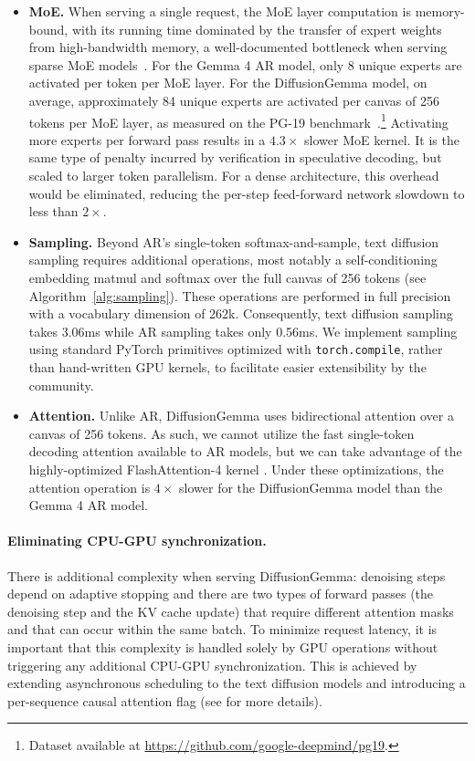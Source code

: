 \documentclass[11pt, a4paper, logo, copyright, gdm]{google}
\begin{document}
\begin{itemize}[topsep=0pt]
    \item \textbf{MoE.} When serving a single request, the MoE layer computation is memory-bound, with its running time dominated by the transfer of expert weights from high-bandwidth memory, a well-documented bottleneck when serving sparse MoE models~\citep{rajbhandari2022deepspeedmoe, huang2024efficient}. For the Gemma 4 AR model, only 8 unique experts are activated per token per MoE layer. For the DiffusionGemma model, on average, approximately 84 unique experts are activated per canvas of 256 tokens per MoE layer, as measured on the PG-19 benchmark~\citep{rae2020compressive}.\footnote{Dataset available at \url{https://github.com/google-deepmind/pg19}.} Activating more experts per forward pass results in a $4.3\times$ slower MoE kernel. It is the same type of penalty incurred by verification in speculative decoding, but scaled to larger token parallelism. For a dense architecture, this overhead would be eliminated, reducing the per-step feed-forward network slowdown to less than $2\times$. 
    \item \textbf{Sampling.} Beyond AR's single-token softmax-and-sample, text diffusion sampling requires additional operations, most notably a self-conditioning embedding matmul and softmax over the full canvas of 256 tokens (see Algorithm~\ref{alg:sampling}). These operations are performed in full precision with a vocabulary dimension of 262k. Consequently, text diffusion sampling takes 3.06ms while AR sampling takes only 0.56ms. We implement sampling using standard PyTorch primitives optimized with \texttt{torch.compile}, rather than hand-written GPU kernels, to facilitate easier extensibility by the community.
    \item \textbf{Attention.} Unlike AR, DiffusionGemma uses bidirectional attention over a canvas of 256 tokens. As such, we cannot utilize the fast single-token decoding attention available to AR models, but we can take advantage of the highly-optimized FlashAttention-4 kernel \citep{dao2022flashattention, zadouri2026flashattention4}. Under these optimizations, the attention operation is $4\times$ slower for the DiffusionGemma model than the Gemma 4 AR model. 
\end{itemize}

\paragraph{Eliminating CPU-GPU synchronization.} There is additional complexity when serving DiffusionGemma: denoising steps depend on adaptive stopping and there are two types of forward passes (the denoising step and the KV cache update) that require different attention masks and that can occur within the same batch. To minimize request latency, it is important that this complexity is handled solely by GPU operations without triggering any additional CPU-GPU synchronization. This is achieved by extending asynchronous scheduling to the text diffusion models and introducing a per-sequence causal attention flag (see \citealp{vllm2026diffusiongemma} for more details).
\end{document}
